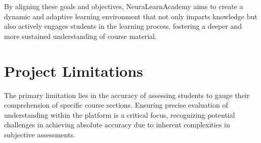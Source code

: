 By aligning these goals and objectives, NeuraLearnAcademy aims to create a dynamic and adaptive learning environment that not only imparts knowledge but also actively engages students in the learning process, fostering a deeper and more sustained understanding of course material.

\section{Project Limitations}
The primary limitation lies in the accuracy of assessing students to gauge their comprehension of specific course sections. Ensuring precise evaluation of understanding within the platform is a critical focus, recognizing potential challenges in achieving absolute accuracy due to inherent complexities in subjective assessments.

